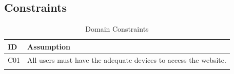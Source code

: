 \subsection{Constraints}
\label{sub:constraints}%

\begin{longtable}{|l|p{}|}
      \hline
      \textbf{ID} & \textbf{Assumption}                                             \\
      \hline
      C01         & All users must have the adequate devices to access the website. \\
      \hline

      \caption{Domain Constraints}
      \label{tab:domain_constraints}
\end{longtable}